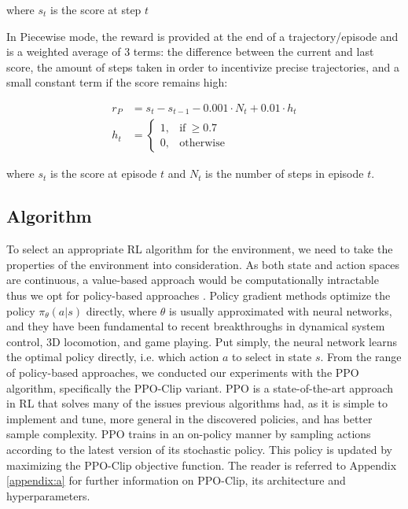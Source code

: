 where $s_t$ is the score at step $t$

In Piecewise mode, the reward is provided at the end of a trajectory/episode and is a weighted average of 3 terms: the difference between the current and last score, the amount of steps taken in order to incentivize precise trajectories, and a small constant term if the score remains high:

\begin{equation}
\begin{aligned}
    r_P &= s_t-s_{t-1} - 0.001\cdot N_t + 0.01\cdot h_t\\
    h_t &=
    \begin{cases}
      1, & \text{if}\ \geq 0.7\\
      0, & \text{otherwise}
    \end{cases}
\end{aligned}
\label{eqn:rewre}
\end{equation}

where $s_t$ is the score at episode $t$ and $N_t$ is the number of steps in episode $t$.

\subsection{Algorithm}

To select an appropriate \gls{RL} algorithm for the environment, we need to take the properties of the environment into consideration.
As both state and action spaces are continuous, a value-based approach would be computationally intractable thus we opt for policy-based approaches \cite{sutton1999policy}.
Policy gradient methods optimize the policy $\pi_\theta(a|s)$ directly, where $\theta$ is usually approximated with neural networks, and they have been fundamental to recent breakthroughs in dynamical system control, 3D locomotion, and game playing.
Put simply, the neural network learns the optimal policy directly, i.e. which action $a$ to select in state $s$.
From the range of policy-based approaches, we conducted our experiments with the \gls{PPO} algorithm, specifically the PPO-Clip variant.
\gls{PPO} \cite{schulman2017proximal} is a state-of-the-art approach in \gls{RL} that solves many of the issues previous algorithms had, as it is simple to implement and tune, more general in the discovered policies, and has better sample complexity.
\gls{PPO} trains in an on-policy manner by sampling actions according to the latest version of its stochastic policy.
This policy is updated by maximizing the PPO-Clip objective function.
The reader is referred to Appendix \ref{appendix:a} for further information on PPO-Clip, its architecture and hyperparameters.

